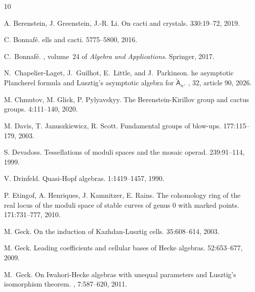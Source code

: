 \documentclass[11pt]{article}
\theoremstyle{plain}
\theoremstyle{definition}
\numberwithin{equation}{section}
\begin{document}
\begin{thebibliography}{10}

A. Berenstein, J. Greenstein, J.-R. Li.
\newblock On cacti and crystals. 
 330:19--72, 2019. 

C. Bonnaf\'e.
ells and cacti.
 5775--5800, 2016. 


C.~{B}onnaf\'e.
, volume~24 of
  {\em Algebra and Applications}.
\newblock Springer, 2017.

N.~{C}hapelier-{L}aget, J.~{G}uilhot, E.~{L}ittle, and J.~{P}arkinson.
he asymptotic {P}lancherel formula and {L}usztig's asymptotic algebra for $\tilde{\mathsf{A}}_n$.
, 32, article 90, 2026.

M. Chmutov, M. Glick, P. Pylyavskyy. 
\newblock The Berenstein-Kirillov group and cactus groups.
 4:111--140, 2020. 

M. Davis, T. Januszkiewicz, R. Scott. 
\newblock Fundamental groups of blow-ups.
 177:115--179, 2003. 

S. Devadoss. 
\newblock Tessellations of moduli spaces and the mosaic operad.
 239:91--114, 1999. 

V. Drinfeld. 
\newblock Quasi-Hopf algebras. 
 1:1419--1457, 1990. 

P. Etingof, A. Henriques, J. Kamnitzer, E. Rains.
\newblock The cohomology ring of the real locus of the moduli space of stable curves of genus $0$ with marked points.
 171:731--777, 2010.

M. Geck. 
\newblock On the induction of Kazhdan-Lusztig cells. 
 35:608--614, 2003.

M. Geck.
\newblock Leading coefficients and cellular bases of Hecke algebras.
 52:653--677, 2009. 

M.~Geck.
\newblock On {I}wahori-{H}ecke algebras with unequal parameters and {L}usztig's
  isomorphism theorem.
, 7:587--620, 2011.



\end{thebibliography}
\end{document}
